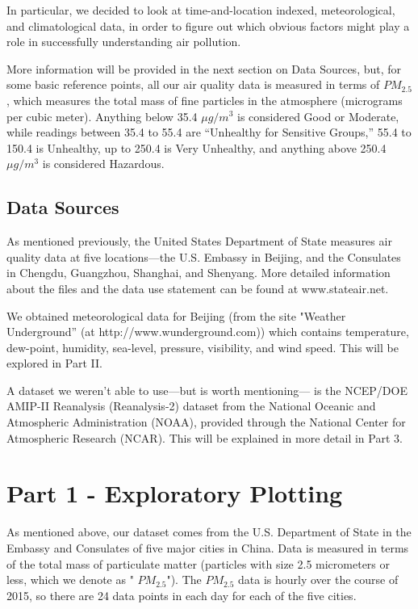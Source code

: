 \documentclass[11pt]{article} %
\begin{document}
In particular, we decided to look at time-and-location indexed, meteorological, and climatological data,
in order to figure out which obvious factors might play a role in successfully understanding air pollution.

More information will be provided in the next section on Data Sources, 
but, for some basic reference points, all our air quality data is measured in terms of 
\(PM_{2.5}\), which measures the 
total mass of fine particles in the atmosphere (micrograms
per cubic meter). Anything below 35.4 \(\mu g/m^3\) is considered
Good or Moderate, while readings between 35.4 to 55.4 are ``Unhealthy for Sensitive Groups,''
55.4 to 150.4 is Unhealthy, up to 250.4 is Very Unhealthy, and anything above 250.4  \(\mu g/m^3\)
is considered Hazardous.

\subsection{Data Sources}

As mentioned previously, the United States Department of State measures
air quality data at five locations---the U.S. Embassy in
Beijing, and the Consulates in Chengdu, Guangzhou,
Shanghai, and Shenyang. More detailed information about
the files and the data use statement can be found at www.stateair.net\cite{StateAirFS, StateAirDU}.

We obtained meteorological data for Beijing (from the site "Weather Underground'' (at http://www.wunderground.com))
which contains temperature, dew-point, humidity, sea-level, pressure, visibility, and wind speed. This will be
explored in Part II.

A dataset we weren't able to use---but is worth mentioning---
is the NCEP/DOE AMIP-II Reanalysis (Reanalysis-2) dataset 
from the National Oceanic and Atmospheric Administration
(NOAA)\cite{NOAA, NOAA2}, provided through 
the National Center for Atmospheric Research (NCAR). This will be explained in more detail in Part 3.

\section{Part 1 - Exploratory Plotting}

	As mentioned above, our dataset comes from the U.S. Department of State in the Embassy and Consulates of five major cities in China. Data is measured in terms of the total mass of particulate matter (particles with size 2.5 micrometers or less, which we denote as " \(PM_{2.5}\)"). The  \(PM_{2.5}\) data is hourly over the course of 2015, so there are 24 data points in each day for each of the five cities.
\end{document}
